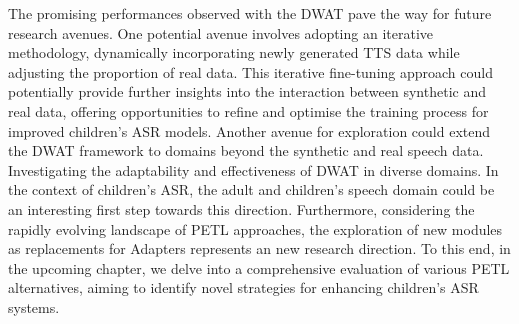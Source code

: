 The promising performances observed with the DWAT pave the way for future research avenues. One potential avenue involves adopting an iterative methodology, dynamically incorporating newly generated TTS data while adjusting the proportion of real data. This iterative fine-tuning approach could potentially provide further insights into the interaction between synthetic and real data, offering opportunities to refine and optimise the training process for improved children's ASR models.
Another avenue for exploration could extend the DWAT framework to domains beyond the synthetic and real speech data. Investigating the adaptability and effectiveness of DWAT in diverse domains. In the context of children's ASR, the adult and children's speech domain could be an interesting first step towards this direction.
Furthermore, considering the rapidly evolving landscape of PETL approaches, the exploration of new modules as replacements for Adapters represents an new research direction. To this end, in the upcoming chapter, we delve into a comprehensive evaluation of various PETL alternatives, aiming to identify novel strategies for enhancing children's ASR systems.